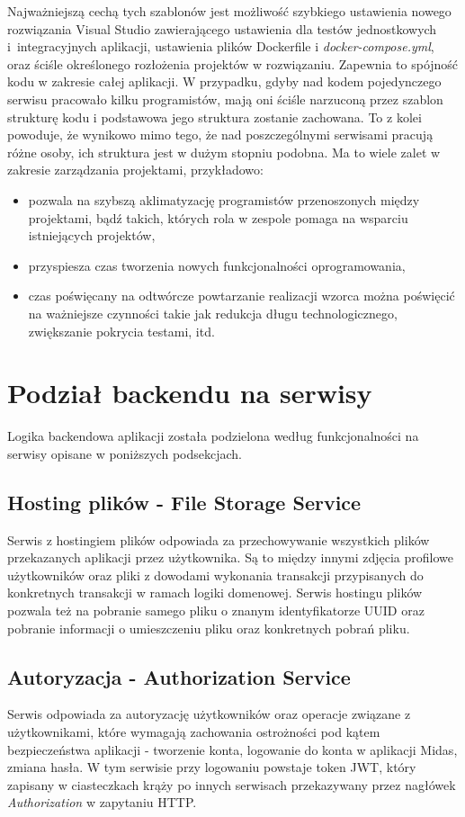\documentclass{SGGW-thesis}
\begin{document}
  Najważniejszą cechą tych szablonów jest możliwość szybkiego ustawienia nowego rozwiązania Visual Studio zawierającego ustawienia dla testów jednostkowych i~integracyjnych aplikacji, ustawienia plików Dockerfile i \textit{docker-compose.yml}, oraz ściśle określonego rozłożenia projektów w rozwiązaniu. Zapewnia to spójność kodu w zakresie całej aplikacji. W przypadku, gdyby nad kodem pojedynczego serwisu pracowało kilku programistów, mają oni ściśle narzuconą przez szablon strukturę kodu i podstawowa jego struktura zostanie zachowana. To z kolei powoduje, że wynikowo mimo tego, że nad poszczególnymi serwisami pracują różne osoby, ich struktura jest w dużym stopniu podobna. Ma to wiele zalet w zakresie zarządzania projektami, przykładowo:

  \begin{itemize}
    \item pozwala na szybszą aklimatyzację programistów przenoszonych między projektami, bądź takich, których rola w zespole pomaga na wsparciu istniejących projektów,
    \item przyspiesza czas tworzenia nowych funkcjonalności oprogramowania,
    \item czas poświęcany na odtwórcze powtarzanie realizacji wzorca można poświęcić na ważniejsze czynności takie jak redukcja długu technologicznego, zwiększanie pokrycia testami, itd.
  \end{itemize}

  \section{Podział backendu na serwisy}
    Logika backendowa aplikacji została podzielona według funkcjonalności na serwisy opisane w poniższych podsekcjach.

    \subsection{Hosting plików - File Storage Service}
    Serwis z hostingiem plików odpowiada za przechowywanie wszystkich plików przekazanych aplikacji przez użytkownika. Są to między innymi zdjęcia profilowe użytkowników oraz pliki z dowodami wykonania transakcji przypisanych do konkretnych transakcji w ramach logiki domenowej. Serwis hostingu plików pozwala też na pobranie samego pliku o znanym identyfikatorze UUID oraz pobranie informacji o umieszczeniu pliku oraz konkretnych pobrań pliku.
    
    \subsection{Autoryzacja - Authorization Service}
    Serwis odpowiada za autoryzację użytkowników oraz operacje związane z użytkownikami, które wymagają zachowania ostrożności pod kątem bezpieczeństwa aplikacji - tworzenie konta, logowanie do konta w aplikacji Midas, zmiana hasła. W tym serwisie przy logowaniu powstaje token JWT, który zapisany w ciasteczkach krąży po innych serwisach przekazywany przez nagłówek \textit{Authorization} w zapytaniu HTTP. 
\end{document}
